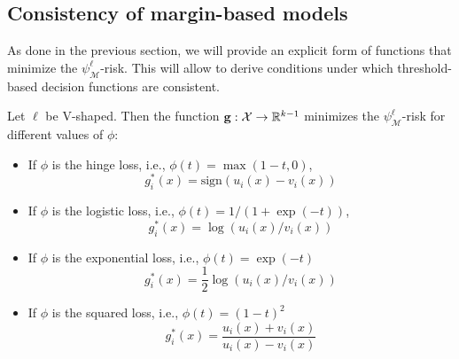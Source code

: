 


\subsection{Consistency of margin-based models}\label{subsec:margin-based}

As done in the previous section, we will provide an explicit form of functions that minimize the $\psi_{\mathcal{M}}^\ell$-risk. This will allow to derive conditions under which threshold-based decision functions are consistent.


\begin{theorem}\label{thm:consistent_marginbased}
Let $\ell$ be V-shaped. Then the function $\mathbf{g}: \mathcal{X} \to {\mathbb R}^{k-1}$ minimizes the $\psi_{\mathcal{M}}^\ell$-risk for different values of $\phi$:
\begin{itemize}
\item If $\phi$ is the hinge loss, i.e., $\phi(t) = \max(1 - t, 0)$, $$g_i^*(x) =  \mathrm{sign}(u_i(x) - v_i(x))$$
\item If $\phi$ is the logistic loss, i.e., $\phi(t) = {1/(1 + \exp(-t))}$, $$g_i^*(x) =  \log(u_i(x) / v_i(x))$$
\item If $\phi$ is the exponential loss, i.e., $\phi(t) = \exp(-t)$ $$g_i^*(x) =  \frac{1}{2}\log(u_i(x) / v_i(x))$$
\item If $\phi$ is the squared loss, i.e., $\phi(t) = (1 - t)^2$ $$g_i^*(x) =  \frac{u_i(x) + v_i(x)}{u_i(x) - v_i(x)}$$
\end{itemize}
\end{theorem}


